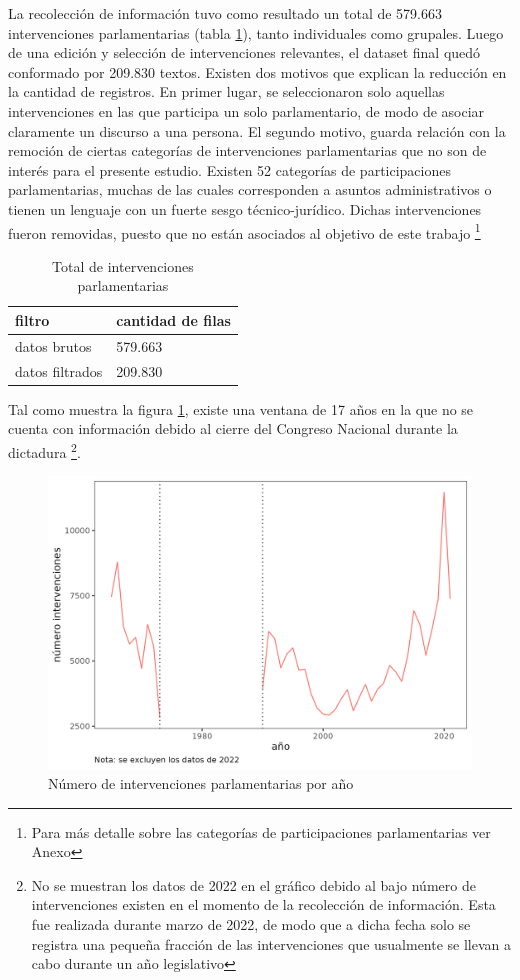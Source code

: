\documentclass[
  12pt,
]{article}
\begin{document}
La recolección de información tuvo como resultado un total de 579.663
intervenciones parlamentarias (tabla \ref{tab:tabla_pre_post_filtro}),
tanto individuales como grupales. Luego de una edición y selección de
intervenciones relevantes, el dataset final quedó conformado por 209.830
textos. Existen dos motivos que explican la reducción en la cantidad de
registros. En primer lugar, se seleccionaron solo aquellas
intervenciones en las que participa un solo parlamentario, de modo de
asociar claramente un discurso a una persona. El segundo motivo, guarda
relación con la remoción de ciertas categorías de intervenciones
parlamentarias que no son de interés para el presente estudio. Existen
52 categorías de participaciones parlamentarias, muchas de las cuales
corresponden a asuntos administrativos o tienen un lenguaje con un
fuerte sesgo técnico-jurídico. Dichas intervenciones fueron removidas,
puesto que no están asociados al objetivo de este trabajo
\footnote{Para más detalle sobre las categorías de participaciones parlamentarias ver Anexo}

\begin{table}[H]

\caption{\label{tab:tabla_pre_post_filtro}Total de intervenciones parlamentarias}
\centering
\begin{tabular}[t]{ll}
\toprule
filtro & cantidad de filas\\
\midrule
datos brutos & 579.663\\
datos filtrados & 209.830\\
\bottomrule
\end{tabular}
\end{table}

Tal como muestra la figura \ref{n_year}, existe una ventana de 17 años
en la que no se cuenta con información debido al cierre del Congreso
Nacional durante la dictadura
\footnote{No se muestran los datos de 2022 en el gráfico debido al bajo número de intervenciones existen en el momento de la recolección de información. Esta fue realizada durante marzo de 2022, de modo que a dicha fecha solo se registra una pequeña fracción de las intervenciones que usualmente se llevan a cabo durante un año legislativo}.

\begin{figure}[H]
\centering
\large
\caption{Número de intervenciones parlamentarias por año}
\label{n_year}
\includegraphics[width = 0.5 \textwidth]{cuadros_tesis/plot_n_year.png}
\normalsize
\end{figure}
\end{document}
